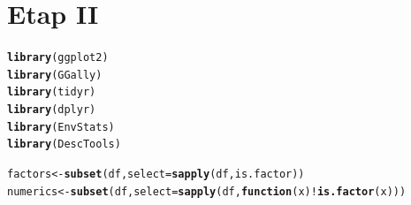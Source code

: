 \documentclass{article}\usepackage[]{graphicx}\usepackage[]{color}
\makeatletter
\newcommand{\hlopt}[1]{\textcolor[rgb]{0,0,0}{#1}}%
\newcommand{\hlstd}[1]{\textcolor[rgb]{0.345,0.345,0.345}{#1}}%
\newcommand{\hlkwa}[1]{\textcolor[rgb]{0.161,0.373,0.58}{\textbf{#1}}}%
\newcommand{\hlkwb}[1]{\textcolor[rgb]{0.69,0.353,0.396}{#1}}%
\newcommand{\hlkwc}[1]{\textcolor[rgb]{0.333,0.667,0.333}{#1}}%
\newcommand{\hlkwd}[1]{\textcolor[rgb]{0.737,0.353,0.396}{\textbf{#1}}}%
\newenvironment{kframe}{%
 \def\at@end@of@kframe{}%
 \ifinner\ifhmode%
  \def\at@end@of@kframe{\end{minipage}}%
  \begin{minipage}{\columnwidth}%
 \fi\fi%
 \def\FrameCommand##1{\hskip\@totalleftmargin \hskip-\fboxsep
 \colorbox{shadecolor}{##1}\hskip-\fboxsep
     \hskip-\linewidth \hskip-\@totalleftmargin \hskip\columnwidth}%
 \MakeFramed {\advance\hsize-\width
   \@totalleftmargin\z@ \linewidth\hsize
   \@setminipage}}%
 {\par\unskip\endMakeFramed%
 \at@end@of@kframe}
\newenvironment{knitrout}{}{} %
\makeatother
\begin{document}
\section{Etap II}

\begin{knitrout}
\color{fgcolor}\begin{kframe}
\begin{alltt}
\hlkwd{library}\hlstd{(ggplot2)}
\hlkwd{library}\hlstd{(GGally)}
\hlkwd{library}\hlstd{(tidyr)}
\hlkwd{library}\hlstd{(dplyr)}
\hlkwd{library}\hlstd{(EnvStats)}
\hlkwd{library}\hlstd{(DescTools)}
\end{alltt}
\end{kframe}
\end{knitrout}

\begin{knitrout}
\color{fgcolor}\begin{kframe}
\begin{alltt}
\hlstd{factors} \hlkwb{<-} \hlkwd{subset}\hlstd{(df,} \hlkwc{select}\hlstd{=}\hlkwd{sapply}\hlstd{(df, is.factor))}
\hlstd{numerics} \hlkwb{<-} \hlkwd{subset}\hlstd{(df,} \hlkwc{select}\hlstd{=}\hlkwd{sapply}\hlstd{(df,} \hlkwa{function}\hlstd{(}\hlkwc{x}\hlstd{)} \hlopt{!}\hlkwd{is.factor}\hlstd{(x)))}
\end{alltt}
\end{kframe}
\end{knitrout}
\end{document}
